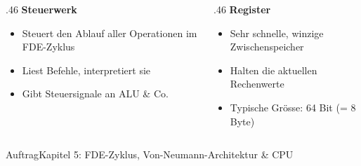 \begin{frame}
\begin{columns}[T,onlytextwidth]
\begin{column}{.46\textwidth}
\large\bfseries\color{FDUteal}Steuerwerk
\vspace{2mm}
\normalsize
\begin{itemize}[<+->]\setlength\itemsep{5pt}
  \item Steuert den Ablauf aller Operationen im FDE-Zyklus
  \item Liest Befehle, interpretiert sie
  \item Gibt Steuersignale an ALU \& Co.
\end{itemize}
\end{column}
\begin{column}{.46\textwidth}
\large\bfseries\color{FDUblue}Register
\vspace{2mm}
\normalsize
\begin{itemize}[<+->]\setlength\itemsep{5pt}
  \item Sehr schnelle, winzige Zwischenspeicher
  \item Halten die aktuellen Rechenwerte
  \item Typische Grösse: 64 Bit (= 8 Byte)
\end{itemize}
\end{column}
\end{columns}
\end{frame}

\begin{frame}{Auftrag}{Kapitel 5: FDE-Zyklus, Von-Neumann-Architektur \& CPU}
\vspace{3mm}
\end{frame}
